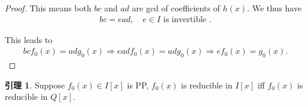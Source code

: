 \documentclass[utf8]{ctexbook}
\theoremstyle{definition}
\newtheorem{lemma}{引理}[section]
\begin{document}
\begin{proof}
This means both $bc$ and $ad$ are gcd of coefficients of $h(x)$. We thus have
\begin{align*}
bc = e ad, \quad e \in I \mbox{ is invertible }.
\end{align*}

This leads to
\begin{align*}
bc f_0 (x) = ad g_0 (x) \Longrightarrow ea d f_0 (x) = ad g_0 (x) \Longrightarrow e f_0 (x) = g_0 (x) .
\end{align*}

\end{proof}


\begin{lemma}
\label{lemma_Factor_poly_ring_3}
Suppose $f_0 (x) \in I[x]$ is PP, $f_0(x)$ is reducible in $I[x]$ iff $f_0 (x)$ is reducible in $Q[x]$.
\end{lemma}
\end{document}
